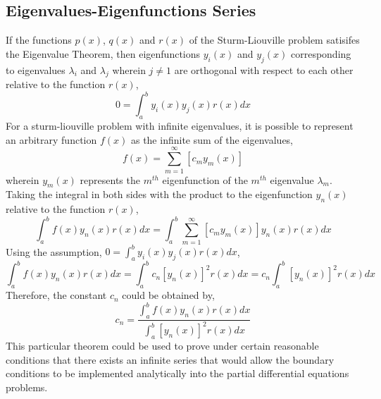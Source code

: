 \documentclass[a4paper, 12pt]{report}
\def\la{\lambda}
\def\f{\frac}
\def\l{\left}
\def\r{\right}
\def\dst{\displaystyle}
\begin{document}
\begin{center}
\subsection{Eigenvalues-Eigenfunctions Series}
If the functions $p(x)$, $q(x)$ and $r(x)$ of the Sturm-Liouville problem satisifes the Eigenvalue Theorem, then eigenfunctions $y_i(x)$ and $y_j(x)$ corresponding to eigenvalues $\la_i$ and $\la_j$ wherein $j\neq1$ are orthogonal with respect to each other relative to the function $r(x)$,
$$0 = \int^{b}_{a}y_i(x)y_j(x)r(x)dx$$
For a sturm-liouville problem with infinite eigenvalues, it is possible to represent an arbitrary function $f(x)$ as the infinite sum of the eigenvalues,
$$f(x) = \sum^{\infty}_{m=1}\l[c_my_m(x)\r]$$
wherein $y_m(x)$ represents the $m^{th}$ eigenfunction of the $m^{th}$ eigenvalue $\la_m$. Taking the integral in both sides with the product to the eigenfunction $y_n(x)$ relative to the function $r(x)$,
$$\int^{b}_{a}f(x)y_n(x)r(x)dx = \int^{b}_{a}\sum^{\infty}_{m=1}\l[c_my_m(x)\r]y_n(x)r(x)dx$$
Using the assumption, $\dst{0 = \int^{b}_{a}y_i(x)y_j(x)r(x)dx}$,
$$\int^{b}_{a}f(x)y_n(x)r(x)dx = \int^{b}_{a}c_n\l[y_n(x)\r]^2r(x)dx = c_n\int^{b}_{a}\l[y_n(x)\r]^2r(x)dx$$
Therefore, the constant $c_n$ could be obtained by,
$$c_n = \f{\dst{\int^{b}_{a}f(x)y_n(x)r(x)dx}}{\dst{\int^{b}_{a}\l[y_n(x)\r]^2r(x)dx}}$$
This particular theorem could be used to prove under certain reasonable conditions that there exists an infinite series that would allow the boundary conditions to be implemented analytically into the partial differential equations problems.

\end{center}
\end{document}
